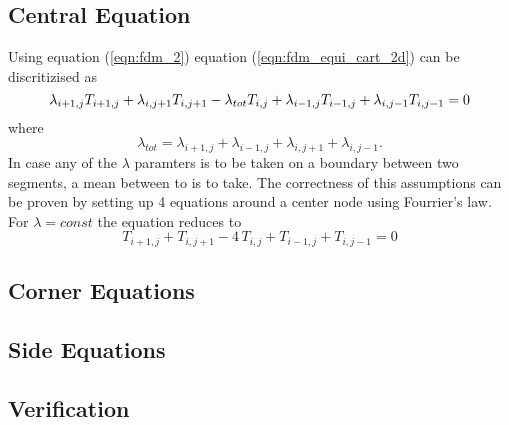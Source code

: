 \subsection{Central Equation}
Using equation (\ref{eqn:fdm_2}) equation (\ref{eqn:fdm_equi_cart_2d}) can be discritizised as
\begin{equation}
  \lambda_{i+1, j}T_{i + 1, j}  + \lambda_{i, j + 1}T_{i, j + 1} - \\
  \lambda_{tot} T_{i, j} + \\
  \lambda_{i-1, j}T_{i-1, j}  + \lambda_{i, j -1}T_{i, j - 1} = 0
\end{equation}
where
\begin{equation}
  \lambda_{tot} = \lambda_{i+1, j} + \lambda_{i-1, j} + \lambda_{i, j+1} + \lambda_{i, j-1}.
\end{equation}
In case any of the $\lambda$ paramters is to be taken on a boundary between two segments, a mean between to is to take.
The correctness of this assumptions can be proven by setting up 4 equations around a center node using Fourrier's law.
For $\lambda = const$ the equation reduces to
\begin{equation}
  T_{i + 1, j}  + T_{i, j + 1} - 4 \, T_{i, j} + T_{i-1, j}  + T_{i, j - 1} = 0
\end{equation}

\subsection{Corner Equations}

\subsection{Side Equations}

\subsection{Verification}
